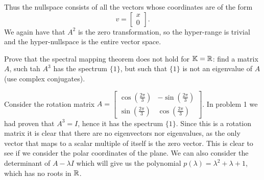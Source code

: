 \documentclass{article}
\begin{document}
\begin{solution}
\begin{itemize}
      Thus the nullspace consists of all the vectors whose coordinates are of the form 
      \[v = \begin{bmatrix} x\\ 0 \end{bmatrix}.\]
      We again have that $A^2$ is the zero transformation, so the hyper-range is trivial and the hyper-nullspace is the entire vector space.
  \end{itemize}
\end{solution}

\begin{problem}
  Prove that the spectral mapping theorem does not hold for $\mathbb{K} = \mathbb{R}$: find a matrix $A$, such tah $A^3$ has the spectrum $\{1\}$, but such that $\{1\}$ is not an eigenvalue of $A$ (use complex conjugates).
\end{problem}

\begin{solution}
  Consider the rotation matrix $A = \begin{bmatrix} \cos(\frac{2 \pi}{3}) & - \sin(\frac{2 \pi}{3})\\ \sin(\frac{2 \pi}{3}) & \cos(\frac{2 \pi}{3}) \end{bmatrix}$.
  In problem 1 we had proven that $A^3 = I$, hence it has the spectrum $\{1\}$.
  Since this is a rotation matrix it is clear that there are no eigenvectors nor eigenvalues, as the only vector that maps to a scalar multiple of itself is the zero vector.
  This is clear to see if we consider the polar coordinates of the plane.
  We can also consider the determinant of $A - \lambda I$ which will give us the polynomial $p(\lambda) = \lambda^2 + \lambda + 1$, which has no roots in $\mathbb{R}$.
\end{solution}
\end{document}
